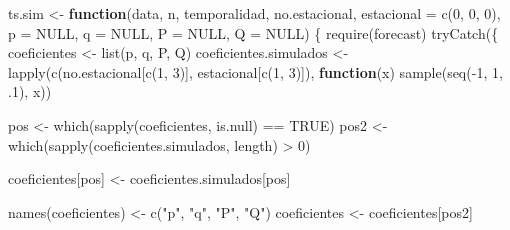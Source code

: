 \documentclass[
]{article}
\newenvironment{Shaded}{\begin{snugshade}}{\end{snugshade}}
\newcommand{\AttributeTok}[1]{\textcolor[rgb]{0.77,0.63,0.00}{#1}}
\newcommand{\ConstantTok}[1]{\textcolor[rgb]{0.00,0.00,0.00}{#1}}
\newcommand{\ControlFlowTok}[1]{\textcolor[rgb]{0.13,0.29,0.53}{\textbf{#1}}}
\newcommand{\DecValTok}[1]{\textcolor[rgb]{0.00,0.00,0.81}{#1}}
\newcommand{\FunctionTok}[1]{\textcolor[rgb]{0.00,0.00,0.00}{#1}}
\newcommand{\NormalTok}[1]{#1}
\newcommand{\OtherTok}[1]{\textcolor[rgb]{0.56,0.35,0.01}{#1}}
\newcommand{\SpecialCharTok}[1]{\textcolor[rgb]{0.00,0.00,0.00}{#1}}
\newcommand{\StringTok}[1]{\textcolor[rgb]{0.31,0.60,0.02}{#1}}
\begin{document}
\begin{Shaded}
\begin{Highlighting}[]
\NormalTok{ts.sim }\OtherTok{\textless{}{-}} \ControlFlowTok{function}\NormalTok{(data,}
\NormalTok{                   n,}
\NormalTok{                   temporalidad,}
\NormalTok{                   no.estacional,}
                   \AttributeTok{estacional =} \FunctionTok{c}\NormalTok{(}\DecValTok{0}\NormalTok{, }\DecValTok{0}\NormalTok{, }\DecValTok{0}\NormalTok{),}
                   \AttributeTok{p =} \ConstantTok{NULL}\NormalTok{,}
                   \AttributeTok{q =} \ConstantTok{NULL}\NormalTok{,}
                   \AttributeTok{P =} \ConstantTok{NULL}\NormalTok{,}
                   \AttributeTok{Q =} \ConstantTok{NULL}\NormalTok{) \{}
    \FunctionTok{require}\NormalTok{(forecast)}
    \FunctionTok{tryCatch}\NormalTok{(\{}
\NormalTok{        coeficientes }\OtherTok{\textless{}{-}} \FunctionTok{list}\NormalTok{(p, q, P, Q)}
\NormalTok{        coeficientes.simulados }\OtherTok{\textless{}{-}} \FunctionTok{lapply}\NormalTok{(}\FunctionTok{c}\NormalTok{(no.estacional[}\FunctionTok{c}\NormalTok{(}\DecValTok{1}\NormalTok{, }\DecValTok{3}\NormalTok{)],}
\NormalTok{                                           estacional[}\FunctionTok{c}\NormalTok{(}\DecValTok{1}\NormalTok{, }\DecValTok{3}\NormalTok{)]),}
                                         \ControlFlowTok{function}\NormalTok{(x)}
                                             \FunctionTok{sample}\NormalTok{(}\FunctionTok{seq}\NormalTok{(}\SpecialCharTok{{-}}\DecValTok{1}\NormalTok{, }\DecValTok{1}\NormalTok{, .}\DecValTok{1}\NormalTok{), x))}
        
\NormalTok{        pos }\OtherTok{\textless{}{-}} \FunctionTok{which}\NormalTok{(}\FunctionTok{sapply}\NormalTok{(coeficientes, is.null) }\SpecialCharTok{==} \ConstantTok{TRUE}\NormalTok{)}
\NormalTok{        pos2 }\OtherTok{\textless{}{-}} \FunctionTok{which}\NormalTok{(}\FunctionTok{sapply}\NormalTok{(coeficientes.simulados, length) }\SpecialCharTok{\textgreater{}} \DecValTok{0}\NormalTok{)}
        
\NormalTok{        coeficientes[pos] }\OtherTok{\textless{}{-}}\NormalTok{ coeficientes.simulados[pos]}
        
        \FunctionTok{names}\NormalTok{(coeficientes) }\OtherTok{\textless{}{-}} \FunctionTok{c}\NormalTok{(}\StringTok{"p"}\NormalTok{, }\StringTok{"q"}\NormalTok{, }\StringTok{"P"}\NormalTok{, }\StringTok{"Q"}\NormalTok{)}
\NormalTok{        coeficientes }\OtherTok{\textless{}{-}}\NormalTok{ coeficientes[pos2]}
        

\end{Highlighting}
\end{Shaded}
\end{document}
